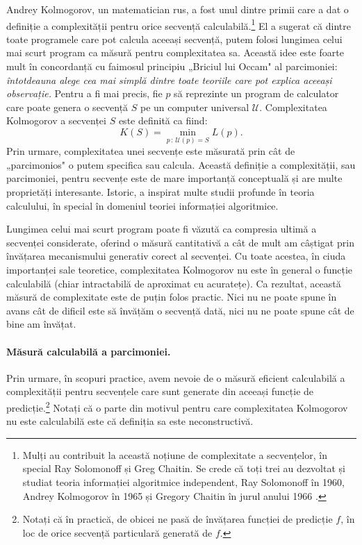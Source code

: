 \documentclass[../../book-main_ro.tex]{subfiles}
\begin{document}
Andrey Kolmogorov, un matematician rus, a fost unul dintre primii care a dat o definiție a complexității pentru orice secvență calculabilă.\footnote{Mulți au contribuit la această noțiune de complexitate a secvențelor, în special Ray Solomonoff și Greg Chaitin. Se crede că toți trei au dezvoltat și studiat teoria informației algoritmice independent, Ray Solomonoff în 1960, Andrey Kolmogorov în 1965 \cite{Kolmogorov1998OnTO} și Gregory Chaitin în jurul anului 1966 \cite{Chaitin-1966}.} El a sugerat că dintre toate programele care pot calcula aceeași secvență, putem folosi lungimea celui mai scurt program ca măsură pentru complexitatea sa. Această idee este foarte mult în concordanță cu faimosul principiu „Briciul lui Occam" al parcimoniei: {\em întotdeauna alege cea mai simplă dintre toate teoriile care pot explica aceeași observație.} Pentru a fi mai precis, fie $p$ să reprezinte un program de calculator care poate genera o secvență $S$ pe un computer universal $\mathcal{U}$. Complexitatea Kolmogorov a secvenței $S$ este definită ca fiind:
\begin{equation}
    K(S) = \min_{p\,:\, \mathcal{U}(p) = S} L(p).
\end{equation}
Prin urmare, complexitatea unei secvențe este măsurată prin cât de „parcimonios" o putem specifica sau calcula. Această definiție a complexității, sau parcimoniei, pentru secvențe este de mare importanță conceptuală și are multe proprietăți interesante. Istoric, a inspirat multe studii profunde în teoria calculului, în special în domeniul teoriei informației algoritmice.

Lungimea celui mai scurt program poate fi văzută ca compresia ultimă a secvenței considerate, oferind o măsură cantitativă a cât de mult am câștigat prin învățarea mecanismului generativ corect al secvenței. Cu toate acestea, în ciuda importanței sale teoretice, complexitatea Kolmogorov nu este în general o funcție calculabilă \cite{Cover-Thomas} (chiar intractabilă de aproximat cu acuratețe). Ca rezultat, această măsură de complexitate este de puțin folos practic. Nici nu ne poate spune în avans cât de dificil este să învățăm o secvență dată, nici nu ne poate spune cât de bine am învățat.





\paragraph{Măsură calculabilă a parcimoniei.}
Prin urmare, în scopuri practice, avem nevoie de o măsură eficient calculabilă a complexității pentru secvențele care sunt generate din aceeași funcție de predicție.\footnote{Notați că în practică, de obicei ne pasă de învățarea funcției de predicție $f$, în loc de orice secvență particulară generată de $f$.} Notați că o parte din motivul pentru care complexitatea Kolmogorov nu este calculabilă este că definiția sa este neconstructivă.
\end{document}
